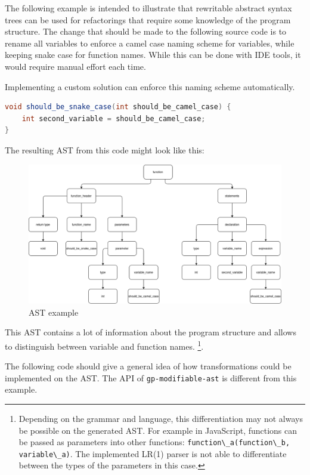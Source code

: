 The following example is intended to illustrate that rewritable abstract syntax trees can be used for refactorings that require some knowledge of the program structure.
The change that should be made to the following source code is to rename all variables to enforce a camel case naming scheme for variables, while keeping
snake case for function names. While this can be done with IDE tools, it would require manual effort each time.

Implementing a custom solution can enforce this naming scheme automatically.

\begin{lstlisting}[language=Java, caption=Example of untransformed code]
void should_be_snake_case(int should_be_camel_case) {
    int second_variable = should_be_camel_case;
}
\end{lstlisting}

The resulting AST from this code might look like this:
\begin{figure}[H]
    \centering
    \includegraphics[scale=0.40]{fig/ast_example.png}
    \caption{AST example}
\end{figure}

This AST contains a lot of information about the program structure and allows to distinguish between variable and function names.
\footnote{
    Depending on the grammar and language, this differentiation may not always be possible on the generated AST. 
    For example in JavaScript, functions can be passed as parameters into other functions: 
    \lstinline{function\_a(function\_b, variable\_a)}.
    The implemented LR(1) parser is not able to differentiate between the types of the parameters in this case.}. 

The following code should give a general idea of how transformations could be implemented on the AST. 
The API of \verb|gp-modifiable-ast| is different from this example.

